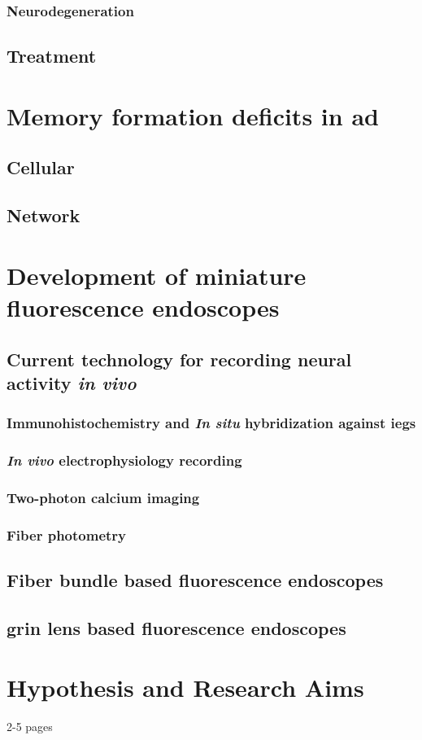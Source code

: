 \subsubsection{Neurodegeneration}
\subsection{Treatment}

\section{Memory formation deficits in \gls{ad}}
\subsection{Cellular}
\subsection{Network}


\section{Development of miniature fluorescence endoscopes}
\subsection{Current technology for recording neural activity \textit{in vivo}}
\subsubsection{Immunohistochemistry and \textit{In situ} hybridization against \glspl{ieg}}
\subsubsection{\textit{In vivo} electrophysiology recording}
\subsubsection{Two-photon calcium imaging}
\subsubsection{Fiber photometry}
\subsection{Fiber bundle based fluorescence endoscopes}
\subsection{\gls{grin} lens based fluorescence endoscopes}


\section{Hypothesis and Research Aims}
2-5 pages
